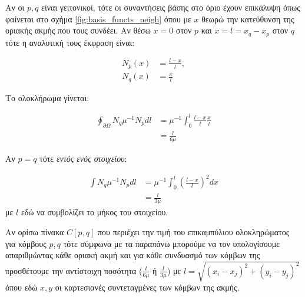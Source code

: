 \documentclass[10pt, letterpaper]{article}
\begin{document}
Αν οι $p,q$ είναι γειτονικοί, τότε οι συναντήσεις βάσης στο όριο έχουν επικάλυψη όπως φαίνεται στο σχήμα \ref{fig:basis_functs_neigh}
όπου με $x$ θεωρώ την κατεύθυνση της οριακής ακμής που τους συνδέει. Αν θέσω $x=0$ στον $p$ και $x=l = x_q - x_p$ 
στον $q$ τότε
η αναλυτική τους έκφραση είναι: 

\begin{center}
  \begin{minipage}[t]{0.45\textwidth}
    \vspace{0pt} %
    \begin{align*}
      N_p(x) &= \frac{l - x}{l}, \\ 
      N_q(x) &= \frac{x}{l}
    \end{align*}
  \end{minipage}
  \hfill
  \begin{minipage}[t]{0.5\textwidth}
    \vspace{0pt} %
  \end{minipage}
  \end{center}
  


Το ολοκλήρωμα γίνεται:

\begin{align*}
  \oint_{\partial \Omega} N_q \mu^{-1} N_p dl &=  \mu^{-1} \int_0^{l} \frac{l - x}{l} \frac{x}{l} \\ 
  &= \frac{l}{6\mu}
\end{align*}

Αν $p = q$ τότε \emph{εντός ενός στοιχείου}: 

\begin{align*}
  \int N_q \mu^{-1} N_p dl &= \mu^{-1} \int_0^{l} \left( \frac{l - x}{l} \right)^2 dx \\ 
  &= \frac{l}{3\mu}
\end{align*}
με $l$ εδώ να συμβολίζει το μήκος του στοιχείου.

Αν ορίσω πίνακα $C[p,q]$ που περιέχει την τιμή του επικαμπύλιου ολοκληρώματος για κόμβους $p,q$ τότε σύμφωνα με τα παραπάνω 
μπορούμε να τον υπολογίσουμε απαριθμώντας κάθε οριακή ακμή και για κάθε συνδυασμό των κόμβων της προσθέτουμε την αντίστοιχη 
ποσότητα ($\frac{l}{6\mu}$ ή $\frac{l}{3\mu}$) με $l = \sqrt{(x_i-x_j)^2 + (y_i-y_j)^2}$ 
όπου εδώ $x,y$ οι καρτεσιανές συντεταγμένες των κόμβων της ακμής. 
\end{document}
